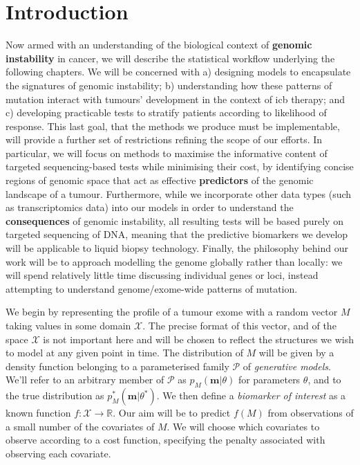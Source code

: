 \documentclass[../thesis.tex]{subfiles}
\begin{document}
\section{Introduction}
Now armed with an understanding of the biological context of \textbf{genomic instability} in cancer, we will describe the statistical workflow underlying the following chapters. We will be concerned with a) designing models to encapsulate the signatures of genomic instability; b) understanding how these patterns of mutation interact with tumours' development in the context of \gls{icb} therapy; and c) developing practicable tests to stratify patients according to likelihood of response. This last goal, that the methods we produce must be implementable, will provide a further set of restrictions refining the scope of our efforts. In particular, we will focus on methods to maximise the informative content of targeted sequencing-based tests while minimising their cost, by identifying concise regions of genomic space that act as effective \textbf{predictors} of the genomic landscape of a tumour. Furthermore, while we incorporate other data types (such as transcriptomics data) into our models in order to understand the \textbf{consequences} of genomic instability, all resulting tests will be based purely on targeted sequencing of DNA, meaning that the predictive biomarkers we develop will be applicable to liquid biopsy technology. Finally, the philosophy behind our work will be to approach modelling the genome globally rather than locally: we will spend relatively little time discussing individual genes or loci, instead attempting to understand genome/exome-wide patterns of mutation.

We begin by representing the profile of a tumour exome with a random vector $M$ taking values in some domain $\mathcal{X}$. The precise format of this vector, and of the space $\mathcal{X}$ is not important here and will be chosen to reflect the structures we wish to model at any given point in time. The distribution of $M$ will be given by a density function belonging to a parameterised family $\mathcal{P}$ of \emph{generative models}. We'll refer to an arbitrary member of $\mathcal{P}$ as $p_M(\mathbf{m} | \theta)$ for parameters $\theta$, and to the true distribution as $p^*_M(\mathbf{m}|\theta^*)$. We then define a \emph{biomarker of interest} as a known function $f: \mathcal{X} \rightarrow \mathbb{R}$. Our aim will be to predict $f(M)$ from observations of a small number of the covariates of $M$. We will choose which covariates to observe according to a cost function, specifying the penalty associated with observing each covariate.
\end{document}
